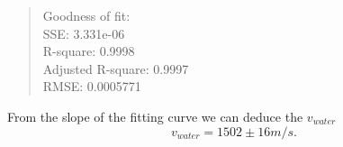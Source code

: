 \begin{quote}
\centering
Goodness of fit:\\
  SSE: 3.331e-06                \\
  R-square: 0.9998              \\
  Adjusted R-square: 0.9997     \\
  RMSE: 0.0005771               
\end{quote}

From the slope of the fitting curve we can deduce the $v_{water}$
\[
    v_{water}=1502 \pm 16 m/s.
\]